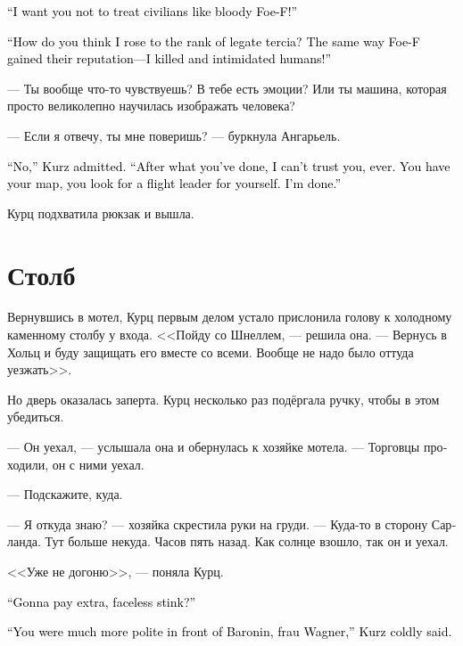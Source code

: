\documentclass[a4paper,12pt,fleqn]{book}\usepackage{cooltooltips}\usepackage{polyglossia}\setdefaultlanguage[babelshorthands=true]{russian}\setotherlanguage{english}\defaultfontfeatures{Ligatures=TeX,Mapping=tex-text} \usepackage{xcolor}\definecolor{lightgray}{HTML}{bbbbbb}\color{lightgray}\newcommand{\ml}[3]{\textenglish{\textcolor{black}{#3}}}
\begin{document}
\ml{$0$}
{--- Я хочу, чтобы ты не уподоблялась Фоу-Ф в обращении с мирными жителями!}
{``I want you not to treat civilians like bloody Foe-F!''}

\ml{$0$}
{--- Как, по-твоему, я стала легатом терция?}
{``How do you think I rose to the rank of legate tercia?}
\ml{$0$}
{Точно так же, как и Фоу-Ф приобрели свою славу --- убивая людей и нагоняя на них страх!}
{The same way Foe-F gained their reputation---I killed and intimidated humans!''}

--- Ты вообще что-то чувствуешь?
В тебе есть эмоции?
Или ты машина, которая просто великолепно научилась изображать человека?

--- Если я отвечу, ты мне поверишь? --- буркнула Ангарьель.

\ml{$0$}
{--- Нет, --- признала Курц.}
{``No,'' Kurz admitted.}
\ml{$0$}
{--- После того, что ты сделала, я вообще не могу тебе верить.}
{``After what you've done, I can't trust you, ever.}
\ml{$0$}
{Карта у тебя, координатора для перелёта ищи сама.}
{You have your map, you look for a flight leader for yourself.}
\ml{$0$}
{С меня хватит.}
{I'm done.''}

Курц подхватила рюкзак и вышла.

\section{Столб}

Вернувшись в мотел, Курц первым делом устало прислонила голову к холодному каменному столбу у входа.
<<Пойду со Шнеллем, --- решила она.
--- Вернусь в Хольц и буду защищать его вместе со всеми.
Вообще не надо было оттуда уезжать>>.

Но дверь оказалась заперта.
Курц несколько раз подёргала ручку, чтобы в этом убедиться.

--- Он уехал, --- услышала она и обернулась к хозяйке мотела.
--- Торговцы проходили, он с ними уехал.

--- Подскажите, куда.

--- Я откуда знаю? --- хозяйка скрестила руки на груди.
--- Куда-то в сторону Сарланда.
Тут больше некуда.
Часов пять назад.
Как солнце взошло, так он и уехал.

<<Уже не догоню>>, --- поняла Курц.

\ml{$0$}
{--- Ты доплачивать-то будешь, вонючка безликая?}
{``Gonna pay extra, faceless stink?''}

\ml{$0$}
{--- Что-то при баронин вы были гораздо вежливее, фрау Вагнер, --- холодно сказала Курц.}
{``You were much more polite in front of Baronin, frau Wagner,'' Kurz coldly said.}
\end{document}
